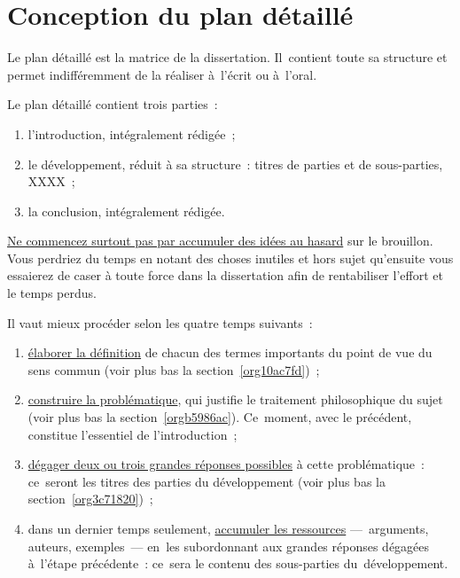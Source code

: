 \documentclass[a4paper,12pt]{report}
\begin{document}
\chapter{Conception du plan détaillé}
\label{sec:orgcd80f80}

Le plan détaillé est la matrice de la dissertation. Il contient toute sa
structure et permet indifféremment de la réaliser à l'écrit ou à l'oral.

Le plan détaillé contient trois parties :

\begin{enumerate}
\item l'introduction, intégralement rédigée ;
\item le développement, réduit à sa structure : titres de parties et de
sous-parties, XXXX ;
\item la conclusion, intégralement rédigée.
\end{enumerate}

\uline{Ne commencez surtout pas par accumuler des idées au hasard} sur le
brouillon. Vous perdriez du temps en notant des choses inutiles et hors
sujet qu'ensuite vous essaierez de caser à toute force dans la
dissertation afin de rentabiliser l'effort et le temps perdus.

Il vaut mieux procéder selon les quatre temps suivants :

\begin{enumerate}
\item \uline{élaborer la définition} de chacun des termes importants du point de
vue du sens commun (voir plus bas la section \ref{org10ac7fd}) ;

\item \uline{construire la problématique}, qui justifie le traitement
philosophique du sujet (voir plus bas la section \ref{orgb5986ac}).
Ce moment, avec le précédent, constitue l'essentiel de
l'introduction ;

\item \uline{dégager deux ou trois grandes réponses possibles} à cette
problématique : ce seront les titres des parties du développement
(voir plus bas la section \ref{org3c71820}) ;

\item dans un dernier temps seulement, \uline{accumuler les ressources}
--- arguments, auteurs, exemples --- en les subordonnant aux grandes
réponses dégagées à l'étape précédente : ce sera le contenu des
sous-parties du développement.
\end{enumerate}
\end{document}
